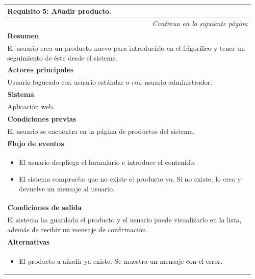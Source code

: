\begin{longtable}{|p{}|}
\hline
 \rowcolor[gray]{.5}
 \color{white}\textbf{Requisito 5: Añadir producto.} \\
\hline
\endfirsthead
\endhead
\hline \multicolumn{1}{r}{\textit{Continua en la siguiente página}} \\
\endfoot
\endlastfoot
    \rowcolor[gray]{.9}
     \textbf{Resumen} \\
     \hline
     El usuario crea un producto nuevo para introducirlo en el frigorífico y tener un seguimiento de éste desde el sistema. \\
     \hline
     \rowcolor[gray]{.9}
     \textbf{Actores principales} \\
     \hline
     Usuario logueado con usuario estándar o con usuario administrador. \\
     \hline
     \rowcolor[gray]{.9}
     \textbf{Sistema} \\
     \hline
     Aplicación web. \\
     \hline
     \rowcolor[gray]{.9}
     \textbf{Condiciones previas} \\
     \hline
     El usuario se encuentra en la página de productos del sistema. \\
     \hline
     \rowcolor[gray]{.9}
     \textbf{Flujo de eventos}  \\
     \hline
      \begin{itemize}
         \item El usuario despliega el formulario e introduce el contenido.
         \item El sistema comprueba que no existe el producto ya. Si no existe, lo crea y devuelve un mensaje al usuario.
     \end{itemize} \\
     \hline
     \rowcolor[gray]{.9}
     \textbf{Condiciones de salida} \\
     \hline
     El sistema ha guardado el producto y el usuario puede visualizarlo en la lista, además de recibir un mensaje de confirmación. \\
     \hline
     \rowcolor[gray]{.9}
     \textbf{Alternativas}  \\
     \hline
      \begin{itemize}
         \item El producto a añadir ya existe. Se muestra un mensaje con el error.
     \end{itemize} \\
     \hline
\end{longtable}

